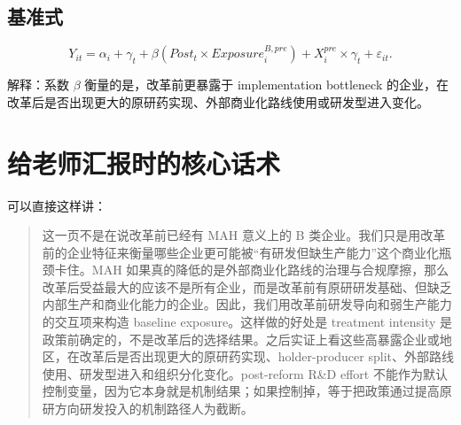 \documentclass[12pt]{ctexart}
\begin{document}
\subsection*{基准式}

\[
Y_{it}=\alpha_i+\gamma_t+\beta(Post_t\times Exposure_i^{B,pre})+X_i^{pre}\times\gamma_t+\varepsilon_{it}.
\]

解释：系数 $\beta$ 衡量的是，改革前更暴露于 implementation bottleneck 的企业，在改革后是否出现更大的原研药实现、外部商业化路线使用或研发型进入变化。

\section{给老师汇报时的核心话术}

可以直接这样讲：

\begin{quote}
这一页不是在说改革前已经有 MAH 意义上的 B 类企业。我们只是用改革前的企业特征来衡量哪些企业更可能被“有研发但缺生产能力”这个商业化瓶颈卡住。MAH 如果真的降低的是外部商业化路线的治理与合规摩擦，那么改革后受益最大的应该不是所有企业，而是改革前有原研研发基础、但缺乏内部生产和商业化能力的企业。因此，我们用改革前研发导向和弱生产能力的交互项来构造 baseline exposure。这样做的好处是 treatment intensity 是政策前确定的，不是改革后的选择结果。之后实证上看这些高暴露企业或地区，在改革后是否出现更大的原研药实现、holder-producer split、外部路线使用、研发型进入和组织分化变化。post-reform R\&D effort 不能作为默认控制变量，因为它本身就是机制结果；如果控制掉，等于把政策通过提高原研方向研发投入的机制路径人为截断。
\end{quote}
\end{document}
